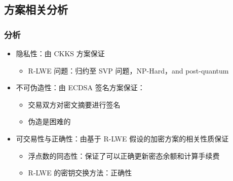\subsection{方案相关分析}

\begin{frame}
    \frametitle{分析}

    \begin{itemize}
        \item 隐私性：由 CKKS 方案保证
        \begin{itemize}
            \item R-LWE 问题：归约至 SVP 问题，NP-Hard，and post-quantum
        \end{itemize}
        \item 不可伪造性：由 ECDSA 签名方案保证：
        \begin{itemize}
            \item 交易双方对密文摘要进行签名
            \item 伪造是困难的
        \end{itemize}
        \item 可交易性与正确性：由基于 R-LWE 假设的加密方案的相关性质保证
        \begin{itemize}
            \item 浮点数的同态性：保证了可以正确更新密态余额和计算手续费
            \item R-LWE 的密钥交换方法：正确性
        \end{itemize}
    \end{itemize}

\end{frame}
